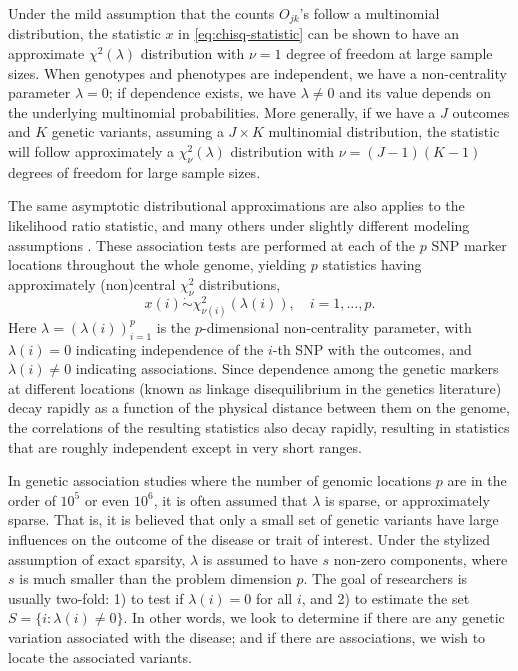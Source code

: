 Under the mild assumption that the counts $O_{jk}$'s follow a multinomial distribution, the statistic $x$ in \eqref{eq:chisq-statistic} can be shown to have an approximate $\chi^2(\lambda)$ distribution with $\nu=1$ degree of freedom at large sample sizes. 
When genotypes and phenotypes are independent, we have a non-centrality parameter $\lambda=0$; if dependence exists, we have $\lambda\neq0$ and its value depends on the underlying multinomial probabilities.
More generally, if we have a $J$ outcomes and $K$ genetic variants, assuming a $J\times K$ multinomial distribution, the statistic will follow approximately a $\chi^2_{\nu}(\lambda)$ distribution with $\nu = (J-1)(K-1)$ degrees of freedom for large sample sizes.

The same asymptotic distributional approximations are also applies to the likelihood ratio statistic, and many others under slightly different modeling assumptions \cite{gao2019upass}.
These association tests are performed at each of the $p$ SNP marker locations throughout the whole genome, yielding $p$ statistics having approximately (non)central $\chi^2_{\nu}$ distributions,
\begin{equation} \label{eq:model-chisquare-approx}
    x(i) \mathrel{\dot\sim} \chi_{\nu(i)}^2\left(\lambda(i)\right), \quad i=1,\ldots,p.
\end{equation}
Here $\lambda = (\lambda(i))_{i=1}^p$ is the $p$-dimensional non-centrality parameter, with $\lambda(i)=0$ indicating independence of the $i$-th SNP with the outcomes, and $\lambda(i)\neq0$ indicating associations.
Since dependence among the genetic markers at different locations (known as linkage disequilibrium in the genetics literature) decay rapidly as a function of the physical distance between them on the genome, the correlations of the resulting statistics also decay rapidly, resulting in statistics that are roughly independent except in very short ranges.

In genetic association studies where the number of genomic locations $p$ are in the order of $10^5$ or even $10^6$, it is often assumed that $\lambda$ is sparse, or approximately sparse.
That is, it is believed that only a small set of genetic variants have large influences on the outcome of the disease or trait of interest.
Under the stylized assumption of exact sparsity, $\lambda$ is assumed to have $s$ non-zero components, where $s$ is much smaller than the problem dimension $p$. 
The goal of researchers is usually two-fold: 1) to test if $\lambda(i)=0$ for all $i$, and 2) to estimate the set $S=\{i:\lambda(i)\neq 0\}$.
In other words, we look to determine if there are any genetic variation associated with the disease; and if there are associations, we wish to locate the associated variants.

